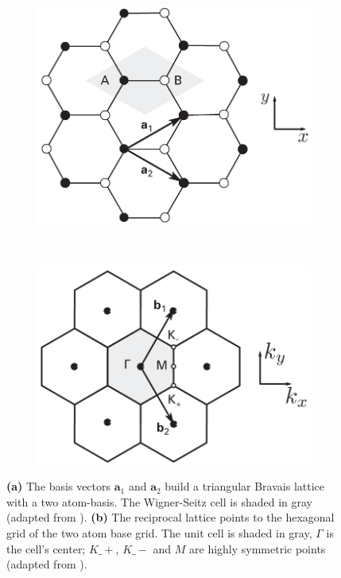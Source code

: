 \begin{figure}[!h]
  \centering
  \begin{subfigure}{0.45\textwidth}
    \includegraphics[width=\textwidth]{./images/cell.png}
  \end{subfigure}
  ~
  \begin{subfigure}{0.45\textwidth}
    \includegraphics[width=\textwidth]{./images/k-cell.png}
  \end{subfigure}
  \caption{\textbf{(a)} The basis vectors $\mathbf{a}_1$ and $\mathbf{a}_2$ build a triangular Bravais lattice with a two atom-basis. The Wigner-Seitz cell is shaded in gray (adapted from \mcite). \textbf{(b)} The reciprocal lattice points to the hexagonal grid of the two atom base grid. The unit cell is shaded in gray, $\Gamma$ is the cell's center; $K\_+$, $K\_-$ and $M$ are highly symmetric points (adapted from \mcite).}
\end{figure}

